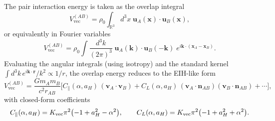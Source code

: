 \documentclass[11pt]{article}
\begin{document}
The pair interaction energy is taken as the overlap integral
\begin{equation}
V_{\mathrm{vec}}^{(AB)}
=
\rho_0\int_{\mathbb{R}^3} d^3x\;
\mathbf{u}_A(\mathbf{x})\cdot \mathbf{u}_B(\mathbf{x}),
\label{eq:overlap-energy-x}
\end{equation}
or equivalently in Fourier variables
\begin{equation}
V_{\mathrm{vec}}^{(AB)}
=
\rho_0\int \frac{d^3k}{(2\pi)^3}\;
\mathbf{u}_A(\mathbf{k})\cdot \mathbf{u}_B(-\mathbf{k})\;
e^{i\mathbf{k}\cdot(\mathbf{x}_A-\mathbf{x}_B)}.
\label{eq:overlap-energy-k}
\end{equation}
Evaluating the angular integrals (using isotropy) and the standard kernel
\(\int d^3k\,e^{i\mathbf{k}\cdot\mathbf{r}}/k^2 \propto 1/r\),
the overlap energy reduces to the EIH-like form
\begin{equation}
V_{\mathrm{vec}}^{(AB)}
=
\frac{G m_A m_B}{c^2 r_{AB}}
\Big[
C_\parallel(\alpha,a_H)\,(\mathbf{v}_A\!\cdot\!\mathbf{v}_B)
+
C_L(\alpha,a_H)\,(\mathbf{v}_A\!\cdot\!\mathbf{n}_{AB})(\mathbf{v}_B\!\cdot\!\mathbf{n}_{AB})
+\cdots
\Big],
\label{eq:Vvec-template}
\end{equation}
with closed-form coefficients
\begin{equation}
C_\parallel(\alpha,a_H)=K_{\rm vec}\pi^2\bigl(-1+a_H^2-\alpha^2\bigr),
\qquad
C_L(\alpha,a_H)=K_{\rm vec}\pi^2\bigl(-1+a_H^2+\alpha^2\bigr).
\label{eq:Cpar-CL-closed}
\end{equation}
\end{document}
